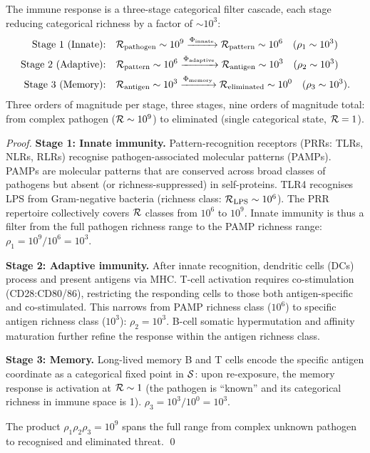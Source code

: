 \begin{theorem}
\label{thm:immune_cascade}
The immune response is a three-stage categorical filter cascade, each stage
reducing categorical richness by a factor of $\sim 10^3$:
\begin{align}
  \text{Stage 1 (Innate):}   &\quad \mathcal{R}_{\mathrm{pathogen}} \sim 10^9 \xrightarrow{\Phi_{\mathrm{innate}}}
                              \mathcal{R}_{\mathrm{pattern}} \sim 10^6 \quad (\rho_1 \sim 10^3) \notag \\
  \text{Stage 2 (Adaptive):} &\quad \mathcal{R}_{\mathrm{pattern}} \sim 10^6 \xrightarrow{\Phi_{\mathrm{adaptive}}}
                              \mathcal{R}_{\mathrm{antigen}} \sim 10^3 \quad (\rho_2 \sim 10^3) \notag \\
  \text{Stage 3 (Memory):}   &\quad \mathcal{R}_{\mathrm{antigen}} \sim 10^3 \xrightarrow{\Phi_{\mathrm{memory}}}
                              \mathcal{R}_{\mathrm{eliminated}} \sim 10^0 \quad (\rho_3 \sim 10^3). \notag
\end{align}
Three orders of magnitude per stage, three stages, nine orders of magnitude
total: from complex pathogen ($\mathcal{R} \sim 10^9$) to eliminated (single
categorical state, $\mathcal{R} = 1$).
\end{theorem}

\begin{proof}
\textbf{Stage 1: Innate immunity.}
Pattern-recognition receptors (PRRs: TLRs, NLRs, RLRs) recognise
pathogen-associated molecular patterns (PAMPs). PAMPs are molecular patterns
that are conserved across broad classes of pathogens but absent (or richness-suppressed)
in self-proteins. TLR4 recognises LPS from Gram-negative bacteria (richness class:
$\mathcal{R}_{\mathrm{LPS}} \sim 10^6$). The PRR repertoire collectively covers
$\mathcal{R}$ classes from $10^6$ to $10^9$. Innate immunity is thus a filter from
the full pathogen richness range to the PAMP richness range:
$\rho_1 = 10^9/10^6 = 10^3$.

\textbf{Stage 2: Adaptive immunity.}
After innate recognition, dendritic cells (DCs) process and present antigens
via MHC. T-cell activation requires co-stimulation (CD28:CD80/86), restricting
the responding cells to those both antigen-specific and co-stimulated. This
narrows from PAMP richness class ($10^6$) to specific antigen richness class
($10^3$): $\rho_2 = 10^3$. B-cell somatic hypermutation and affinity maturation
further refine the response within the antigen richness class.

\textbf{Stage 3: Memory.}
Long-lived memory B and T cells encode the specific antigen coordinate as
a categorical fixed point in $\mathcal{S}$: upon re-exposure, the memory response
is activation at $\mathcal{R} \sim 1$ (the pathogen is ``known'' and its categorical
richness in immune space is 1). $\rho_3 = 10^3/10^0 = 10^3$.

The product $\rho_1 \rho_2 \rho_3 = 10^9$ spans the full range from complex
unknown pathogen to recognised and eliminated threat. \qed
\end{proof}

